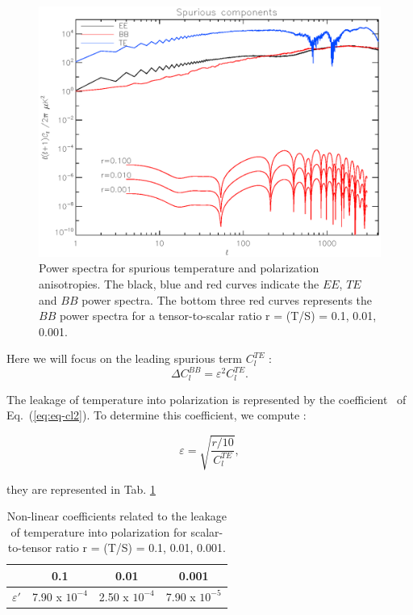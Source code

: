 \begin{figure}[h]
\center
	\includegraphics[scale=0.5]{Figures/cl2_spurious.eps}
	\caption{Power spectra for spurious temperature and polarization anisotropies. The black, blue and red curves indicate the $EE$, $TE$ and $BB$ power spectra. The bottom three red curves represents the $BB$ power spectra for a tensor-to-scalar ratio r = (T/S) = 0.1, 0.01, 0.001.}
	\label{fig:cl2}
\end{figure}

Here we will focus on the leading spurious term $C_{l}^{TE}$ : 
\begin{equation}
\Delta C_{l}^{BB} = \varepsilon^{2} C_{l}^{TE}.
\label{eq:eq-cl2}
\end{equation}

The leakage of temperature into polarization is represented by the coefficient \eps\ of Eq.~(\ref{eq:eq-cl2}). To determine this coefficient, we compute :

\begin{equation}
\varepsilon = \sqrt{\dfrac{r/10}{C_{l}^{TE}}},
\label{eq:eq-cl3}
\end{equation}

they are represented in Tab. \ref{tab:eps-lkg}

\begin{table}[h!]
\center
	\begin{tabular}{|c|c|c|c|}
  	\hline
 	\backslashbox{$\varepsilon$}{$r$} & 0.1 & 0.01 & 0.001 \\
	\hline
	$\varepsilon'$ & 7.90 x $10^{-4}$ & 2.50 x $10^{-4}$ & 7.90 x $10^{-5}$\\
  	\hline
	\end{tabular} 
\caption{Non-linear coefficients related to the leakage of temperature into polarization for scalar-to-tensor ratio r = (T/S) = 0.1, 0.01, 0.001.}
\label{tab:eps-lkg}
\end{table}

